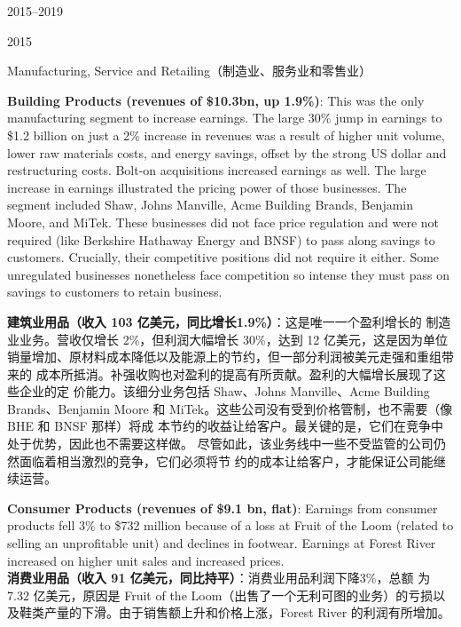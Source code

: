\begin{chapter}{2015--2019}
\begin{section}{2015}
\begin{subsection}{Manufacturing, Service and Retailing（制造业、服务业和零售业）}
\begin{verseparallel}
  {
    \textbf{Building Products (revenues of \$10.3bn, up 1.9\%)}: This was the
    only manufacturing segment to increase earnings. The large 30\% jump in
    earnings to \$1.2 billion on just a 2\% increase in revenues was a result of
    higher unit volume, lower raw materials costs, and energy savings, offset by
    the strong US dollar and restructuring costs. Bolt-on acquisitions increased
    earnings as well. The large increase in earnings illustrated the pricing
    power of those businesses. The segment included Shaw, Johns Manville, Acme
    Building Brands, Benjamin Moore, and MiTek. These businesses did not face
    price regulation and were not required (like Berkshire Hathaway Energy and
    BNSF) to pass along savings to customers. Crucially, their competitive
    positions did not require it either. Some unregulated businesses nonetheless
    face competition so intense they must pass on savings to customers to retain
    business. \\
  }
  {

    \textbf{建筑业用品（收入 103 亿美元，同比增长1.9\%）}：这是唯一一个盈利增长的
    制造业业务。营收仅增长 2\%，但利润大幅增长 30\%，达到 12 亿美元，这是因为单位
    销量增加、原材料成本降低以及能源上的节约，但一部分利润被美元走强和重组带来的
    成本所抵消。补强收购也对盈利的提高有所贡献。盈利的大幅增长展现了这些企业的定
    价能力。该细分业务包括 Shaw、Johns Manville、Acme Building Brands、Benjamin
    Moore 和 MiTek。这些公司没有受到价格管制，也不需要（像 BHE 和 BNSF 那样）将成
    本节约的收益让给客户。最关键的是，它们在竞争中处于优势，因此也不需要这样做。
    尽管如此，该业务线中一些不受监管的公司仍然面临着相当激烈的竞争，它们必须将节
    约的成本让给客户，才能保证公司能继续运营。

  }
\end{verseparallel}

\begin{verseparallel}
  {
    \textbf{Consumer Products (revenues of \$9.1 bn, flat)}: Earnings from
    consumer products fell 3\% to \$732 million because of a loss at Fruit of
    the Loom (related to selling an unprofitable unit) and declines in footwear.
    Earnings at Forest River increased on higher unit sales and increased
    prices. \\
  }
  {
    \textbf{消费业用品（收入 91 亿美元，同比持平）}：消费业用品利润下降3\%，总额
    为 7.32 亿美元，原因是 Fruit of the Loom（出售了一个无利可图的业务）的亏损以
    及鞋类产量的下滑。由于销售额上升和价格上涨，Forest River 的利润有所增加。
  }
\end{verseparallel}


\end{subsection}
\end{section}
\end{chapter}
